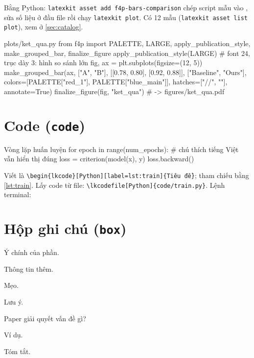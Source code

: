 \documentclass[10pt,a4paper]{article}
\begin{document}
Bằng Python: \texttt{latexkit asset add f4p-bars-comparison} chép script mẫu vào ,
sửa số liệu ở đầu file rồi chạy \texttt{latexkit plot}. Có 12 mẫu (\texttt{latexkit asset list plot}),
xem ở \cref{sec:catalog}.
\begin{lkcode}[Python]{plots/ket\_qua.py}
from f4p import PALETTE, LARGE, apply_publication_style, make_grouped_bar, finalize_figure
apply_publication_style(LARGE)            # font 24, trục dày 3: hình so sánh lớn
fig, ax = plt.subplots(figsize=(12, 5))
make_grouped_bar(ax, ["A", "B"], [[0.78, 0.80], [0.92, 0.88]], ["Baseline", "Ours"],
                 colors=[PALETTE["red_1"], PALETTE["blue_main"]], hatches=["//", ""], annotate=True)
finalize_figure(fig, "ket_qua")           # -> figures/ket_qua.pdf
\end{lkcode}

\section{Code (\texttt{code})}
\begin{lkcode}[Python][label=lst:train]{Vòng lặp huấn luyện}
for epoch in range(num_epochs):     # chú thích tiếng Việt vẫn hiển thị đúng
    loss = criterion(model(x), y)
    loss.backward()
\end{lkcode}
Viết là \verb|\begin{lkcode}[Python][label=lst:train]{Tiêu đề}|; tham chiếu bằng \cref{lst:train}.
Lấy code từ file: \verb|\lkcodefile[Python]{code/train.py}|. Lệnh terminal:

\section{Hộp ghi chú (\texttt{box})}
\begin{demo}
\begin{keyidea} Ý chính của phần. \end{keyidea}
\begin{info} Thông tin thêm. \end{info}
\begin{tip} Mẹo. \end{tip}
\begin{warning} Lưu ý. \end{warning}
\begin{question} Paper giải quyết vấn đề gì? \end{question}
\begin{examplebox} Ví dụ. \end{examplebox}
\begin{summary} Tóm tắt. \end{summary}
\end{demo}
\end{document}
